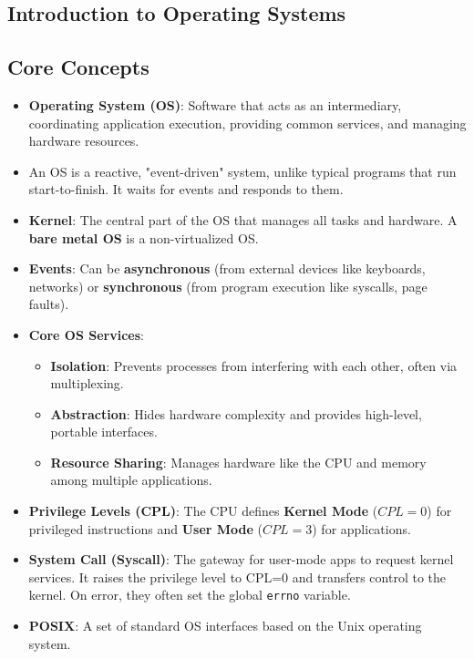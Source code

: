 \documentclass[8pt,a4paper]{article}
\begin{document}
\begin{multicols}{2}

\section*{Introduction to Operating Systems}
\subsection*{Core Concepts}
\begin{itemize}
    \item \textbf{Operating System (OS)}: Software that acts as an intermediary, coordinating application execution, providing common services, and managing hardware resources.
    \item An OS is a reactive, "event-driven" system, unlike typical programs that run start-to-finish. It waits for events and responds to them.
    \item \textbf{Kernel}: The central part of the OS that manages all tasks and hardware. A \textbf{bare metal OS} is a non-virtualized OS.
    \item \textbf{Events}: Can be \textbf{asynchronous} (from external devices like keyboards, networks) or \textbf{synchronous} (from program execution like syscalls, page faults).
    \item \textbf{Core OS Services}:
    \begin{itemize}
        \item \textbf{Isolation}: Prevents processes from interfering with each other, often via multiplexing.
        \item \textbf{Abstraction}: Hides hardware complexity and provides high-level, portable interfaces.
        \item \textbf{Resource Sharing}: Manages hardware like the CPU and memory among multiple applications.
    \end{itemize}
    \item \textbf{Privilege Levels (CPL)}: The CPU defines \textbf{Kernel Mode} ($CPL=0$) for privileged instructions and \textbf{User Mode} ($CPL=3$) for applications.
    \item \textbf{System Call (Syscall)}: The gateway for user-mode apps to request kernel services. It raises the privilege level to CPL=0 and transfers control to the kernel. On error, they often set the global \texttt{errno} variable.
    \item \textbf{POSIX}: A set of standard OS interfaces based on the Unix operating system.
\end{itemize}


\end{multicols}
\end{document}
